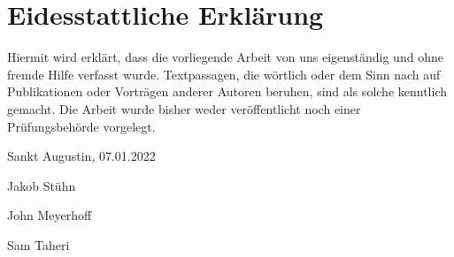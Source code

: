 \section*{Eidesstattliche Erklärung}

Hiermit wird erklärt, dass die vorliegende Arbeit von uns eigenständig und ohne fremde
Hilfe verfasst wurde. Textpassagen, die wörtlich oder dem Sinn nach auf Publikationen
oder Vorträgen anderer Autoren beruhen, sind als solche kenntlich gemacht.
Die Arbeit wurde bisher weder veröffentlicht noch einer Prüfungsbehörde vorgelegt.

Sankt Augustin, 07.01.2022

\vspace*{50px}
Jakob Stühn
\hrulefill

\vspace*{50px}
John Meyerhoff
\hrulefill

\vspace*{50px}
Sam Taheri
\hrulefill